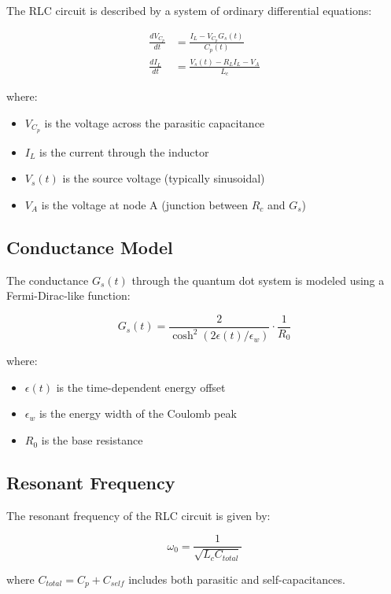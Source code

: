 \documentclass{article}
\begin{document}
The RLC circuit is described by a system of ordinary differential equations:

\begin{align}
\frac{dV_{C_p}}{dt} &= \frac{I_L - V_{C_p} G_s(t)}{C_p(t)} \\
\frac{dI_L}{dt} &= \frac{V_s(t) - R_L I_L - V_A}{L_c}
\end{align}

where:
\begin{itemize}
\item $V_{C_p}$ is the voltage across the parasitic capacitance
\item $I_L$ is the current through the inductor
\item $V_s(t)$ is the source voltage (typically sinusoidal)
\item $V_A$ is the voltage at node A (junction between $R_c$ and $G_s$)
\end{itemize}

\subsection{Conductance Model}

The conductance $G_s(t)$ through the quantum dot system is modeled using a Fermi-Dirac-like function:

\begin{equation}
G_s(t) = \frac{2}{\cosh^2(2\epsilon(t)/\epsilon_w)} \cdot \frac{1}{R_0}
\end{equation}

where:
\begin{itemize}
\item $\epsilon(t)$ is the time-dependent energy offset
\item $\epsilon_w$ is the energy width of the Coulomb peak
\item $R_0$ is the base resistance
\end{itemize}

\subsection{Resonant Frequency}

The resonant frequency of the RLC circuit is given by:

\begin{equation}
\omega_0 = \frac{1}{\sqrt{L_c C_{total}}}
\end{equation}

where $C_{total} = C_p + C_{self}$ includes both parasitic and self-capacitances.
\end{document}
